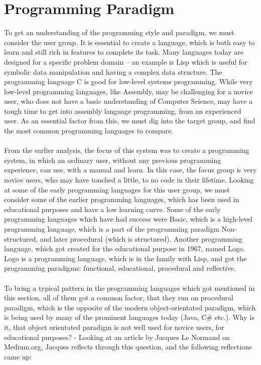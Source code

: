 \section{Programming Paradigm}
\label{programmingparadigm}
To get an understanding of the programming style and paradigm, we must consider the user group. It is essential to create a language, which is both easy to learn and still rich in features to complete its task. Many languages today are designed for a specific problem domain – an example is Lisp which is useful for symbolic data manipulation and having a complex data structure. The programming language C is good for low-level systems programming. While very low-level programming languages, like Assembly, may be challenging for a novice user, who does not have a basic understanding of Computer Science, may have a tough time to get into assembly language programming, from an experienced user. As an essential factor from this, we must dig into the target group, and find the most common programming languages to compare.  \\
\\
From the earlier analysis, the focus of this system was to create a programming system, in which an ordinary user, without any previous programming experience, can use, with a manual and learn. In this case, the focus group is very novice users, who may have touched a little, to no code in their lifetime. Looking at some of the early programming languages for this user group, we must consider some of the earlier programming languages, which has been used in educational purposes and have a low learning curve. Some of the early programming languages which have had success were Basic, which is a high-level programming language, which is a part of the programming paradigm Non-structured, and later procedural (which is structured). Another programming language, which got created for the educational purpose in 1967, named Logo. Logo is a programming language, which is in the family with Lisp, and got the programming paradigms: functional, educational, procedural and reflective.\cite{scott2000programming} \\  
\\
To bring a typical pattern in the programming languages which got mentioned in this section, all of them got a common factor, that they run on procedural paradigm, which is the opposite of the modern object-orientated paradigm, which is being used by many of the prominent languages today (Java, C\# etc.). Why is it, that object orientated paradigm is not well used for novice users, for educational purposes? - Looking at an article by Jacques Le Normand on Medium.org, Jacques reflects through this question, and the following reflections came up:\cite{tutlisp}\cite{medlisp} \\
